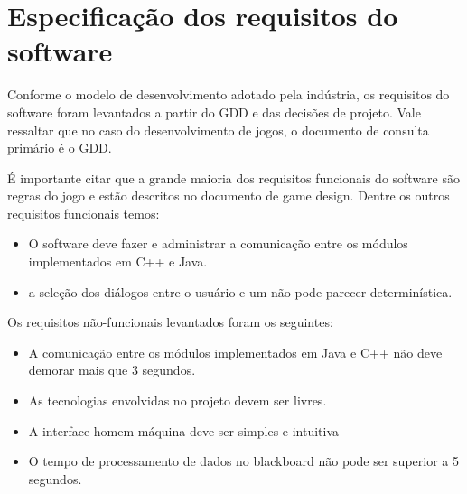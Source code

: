 \section{Especificação dos requisitos do software}
Conforme o modelo de desenvolvimento adotado pela indústria, os requisitos do software foram levantados a partir do GDD e das decisões de projeto. Vale ressaltar que no caso do desenvolvimento de jogos, o documento de consulta primário é o GDD.

É importante citar que a grande maioria dos requisitos funcionais do software são regras do jogo e estão descritos no documento de game design. Dentre os outros requisitos funcionais temos:
\begin{itemize}
\item O software deve fazer e administrar a comunicação entre os módulos implementados em C++ e Java.
\item a seleção dos diálogos entre o usuário e um \npc{} não pode parecer determinística.
\end{itemize}

Os requisitos não-funcionais levantados foram os seguintes:
\begin{itemize}
\item A comunicação entre os módulos implementados em Java e C++ não deve demorar mais que 3 segundos.
\item As tecnologias envolvidas no projeto devem ser livres.
\item A interface homem-máquina deve ser simples e intuitiva
\item O tempo de processamento de dados no blackboard não pode ser superior a 5 segundos.
\end{itemize}
